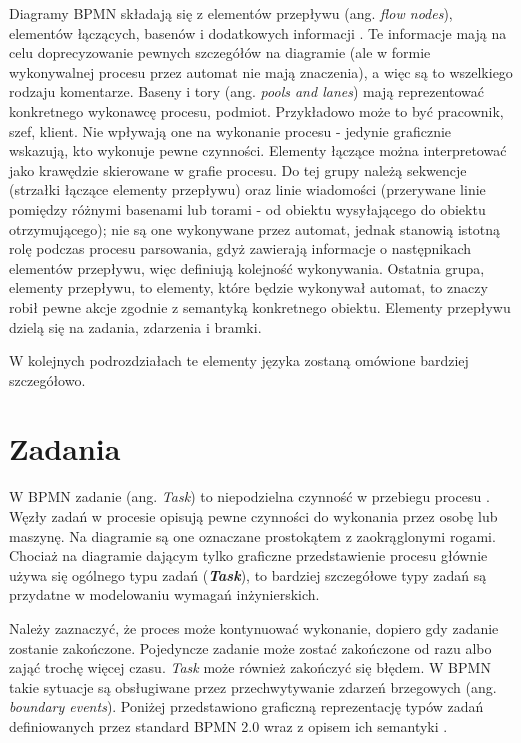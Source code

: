 \documentclass[declaration,shortabstract,mgr]{iithesis}
\newcommand{\bpmn}{BPMN }
\begin{document}
Diagramy \bpmn składają się z elementów przepływu (ang. \emph{flow nodes}), elementów łączących, basenów i dodatkowych informacji \cite{process-maker-bpmn}. Te informacje mają na celu doprecyzowanie pewnych szczegółów na diagramie (ale w formie wykonywalnej procesu przez automat nie mają znaczenia), a więc są to wszelkiego rodzaju komentarze. Baseny i tory (ang. \emph{pools and lanes}) mają reprezentować konkretnego wykonawcę procesu, podmiot. Przykładowo może to być pracownik, szef, klient. Nie wpływają one na wykonanie procesu - jedynie graficznie wskazują, kto wykonuje pewne czynności. Elementy łączące można interpretować jako krawędzie skierowane w grafie procesu. Do tej grupy należą sekwencje (strzałki łączące elementy przepływu) oraz linie wiadomości (przerywane linie pomiędzy różnymi basenami lub torami - od obiektu wysyłającego do obiektu otrzymującego); nie są one wykonywane przez automat, jednak stanowią istotną rolę podczas procesu parsowania, gdyż zawierają informacje o następnikach elementów przepływu, więc definiują kolejność wykonywania. Ostatnia grupa, elementy przepływu, to elementy, które będzie wykonywał automat, to znaczy robił pewne akcje zgodnie z semantyką konkretnego obiektu. Elementy przepływu dzielą się na zadania, zdarzenia i bramki.

W kolejnych podrozdziałach te elementy języka zostaną omówione
bardziej szczegółowo.

\section{Zadania}
W \bpmn zadanie (ang. \textit{Task}) to niepodzielna czynność w przebiegu procesu \cite{bruce-silver-bpmn-tasks}. Węzły zadań w procesie opisują pewne czynności do wykonania przez osobę lub maszynę. Na diagramie są one oznaczane prostokątem z zaokrąglonymi rogami. Chociaż na diagramie dającym tylko graficzne przedstawienie procesu głównie używa się ogólnego typu zadań (\textbf{\textit{Task}}), to bardziej szczegółowe typy zadań są przydatne w modelowaniu wymagań inżynierskich. 

Należy zaznaczyć, że proces może kontynuować wykonanie, dopiero gdy zadanie zostanie zakończone. Pojedyncze zadanie może zostać zakończone od razu albo zająć trochę więcej czasu. \textit{Task} może również zakończyć się błędem. W \bpmn takie sytuacje są obsługiwane przez przechwytywanie zdarzeń brzegowych (ang. \textit{boundary events}). Poniżej przedstawiono graficzną reprezentację typów zadań definiowanych przez standard \bpmn 2.0 wraz z opisem ich semantyki \cite{visual-paradigm-tasks-explained}.
\end{document}
